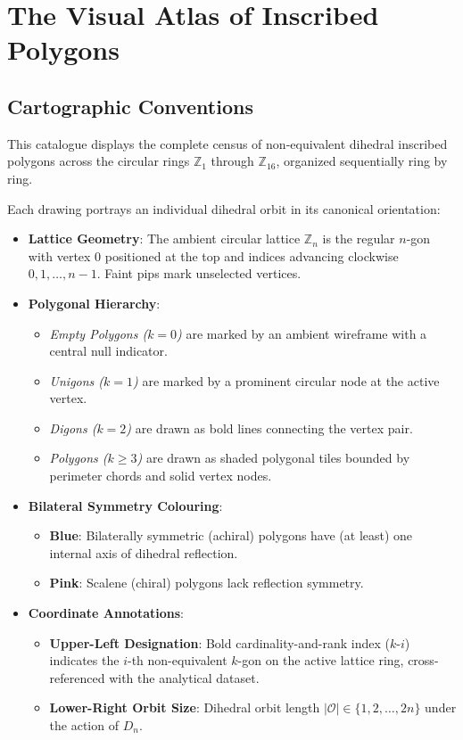\chapter{The Visual Atlas of Inscribed Polygons}
\label{chap:visual-atlas}

\section*{Cartographic Conventions}

This catalogue displays the complete census of non-equivalent
dihedral inscribed polygons across the circular rings $\mathbb{Z}_1$
through $\mathbb{Z}_{16}$, organized sequentially ring by ring.

Each drawing portrays an individual dihedral orbit in its canonical orientation:
\begin{itemize}
    \item \textbf{Lattice Geometry}: The ambient circular lattice $\mathbb{Z}_n$ is the regular $n$-gon with vertex $0$ positioned at the top and indices advancing clockwise $0, 1, \dots, n-1$. Faint pips mark unselected vertices.
    \item \textbf{Polygonal Hierarchy}:
    \begin{itemize}
        \item \emph{Empty Polygons ($k=0$)} are marked by an ambient wireframe with a central null indicator.
        \item \emph{Unigons ($k=1$)} are marked by a prominent circular node at the active vertex.
        \item \emph{Digons ($k=2$)} are drawn as bold lines connecting the vertex pair.
        \item \emph{Polygons ($k \ge 3$)} are drawn as shaded polygonal tiles bounded by perimeter chords and solid vertex nodes.
    \end{itemize}
    \item \textbf{Bilateral Symmetry Colouring}:
    \begin{itemize}
        \item \textbf{Blue}: Bilaterally symmetric (achiral) polygons have (at least) one internal axis of dihedral reflection.
        \item \textbf{Pink}: Scalene (chiral) polygons lack reflection symmetry.
    \end{itemize}
    \item \textbf{Coordinate Annotations}:
    \begin{itemize}
        \item \textbf{Upper-Left Designation}: Bold cardinality-and-rank index ($k\text{-}i$) indicates the $i$-th non-equivalent $k$-gon on the active lattice ring, cross-referenced with the analytical dataset.
        \item \textbf{Lower-Right Orbit Size}: Dihedral orbit length $|\mathcal{O}| \in \{1, 2, \dots, 2n\}$ under the action of $D_n$.
    \end{itemize}
\end{itemize}

